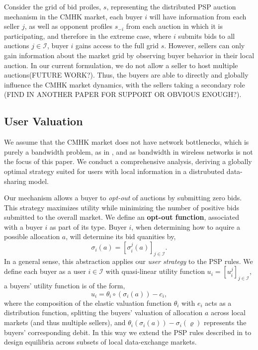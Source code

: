 \documentclass[sigconf, anonymous]{acmart}
\newcommand{\mcI}{\mathcal{I}}
\newcommand{\g}{\sigma}
\theoremstyle{definition}
\begin{document}
Consider the grid of bid proiles, $s$, representing the distributed PSP auction
mechanism in the CMHK market, each buyer $i$ will
have information from each seller $j$, as well as opponent profiles $s_{-i}$
from each auction in which it is participating, and therefore
in the extreme case, where $i$ submits bids to all auctions $j\in\mcI$, buyer
$i$ gains access to the full grid $s$. However, 
sellers can only gain information about the market grid by observing buyer
behavior in their local auction.
In our current formulation, we do not allow a seller to host multiple
auctions(FUTURE WORK?). Thus, the buyers are able to directly and globally
influence the CMHK market dynamics, with the sellers taking a secondary role
(FIND IN ANOTHER PAPER FOR SUPPORT OR OBVIOUS ENOUGH?).



\subsection{User Valuation}

We assume that the CMHK market does not have network
bottlenecks, which is purely a bandwidth problem, as in \cite{semret}, and as
bandwidth in wireless networks is not the focus of this paper. We
conduct a comprehensive analysis, deriving a globally optimal strategy suited for
users with local information in a distrubuted data-sharing model. 

Our mechanism allows a buyer
to \emph{opt-out} of auctions by submitting zero bids. This strategy maximizes
utility while minimizing the number of positive bids submitted to the overall
market. We define an \textbf{opt-out function}, associated with a buyer $i$ as
part of its type. Buyer $i$, when determining how to aquire a possible allocation $a$,
will determine its bid quanities by,
\begin{equation}\label{opt-out}
    \g_i(a) = [\g_i^j(a)]_{j\in\mcI}.
\end{equation}
In a general sense, this abstraction applies our \emph{user strategy}
to the PSP rules.
We define each buyer as a user $i\in\mcI$ with quasi-linear utility
function $u_i = [u_i^j]_{j\in\mcI}$, a buyers' utility function is of the form,
\begin{equation}\label{buyerutility}
    u_i = \theta_i \circ (\g_i(a)) - c_i,
\end{equation}
where the composition of the elastic valuation function $\theta_i$ with $e_i$ acts as a distribution function, splitting
the buyers' valuation of allocation $a$ across local markets (and thus multiple
sellers), and $\theta_i(\g_i(a)) - \g_i(\varrho)$ represents the buyers'
corresponding debit.  
In this way we extend the PSP rules described
in \cite{semret} to design equilibria across subsets of local data-exchange markets.
\end{document}
